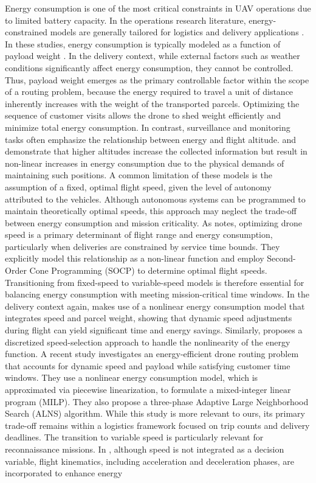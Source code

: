\documentclass[11pt]{article}
\begin{document}
Energy consumption is one of the most critical constraints in UAV operations due to limited battery capacity. In the operations research literature, energy-constrained models are generally tailored for logistics and delivery applications \citep{rojas2021unmanned}.  In these studies, energy consumption is typically modeled as a function of payload weight \citep{cheng2020drone, dorling2016vehicle, kyriakakis2023grasp, troudi2018sizing}. In the delivery context, while external factors such as weather conditions significantly affect energy consumption, they cannot be controlled. Thus, payload weight emerges as the primary controllable factor within the scope of a routing problem, because the energy required to travel a unit of distance inherently increases with the weight of the transported parcels. Optimizing the sequence of customer visits allows the drone to shed weight efficiently and minimize total energy consumption. In contrast, surveillance and monitoring tasks often emphasize the relationship between energy and flight altitude. \citep{di2016modelling} and \citep{zorbas2016optimal} demonstrate that higher altitudes increase the collected information but result in non-linear increases in energy consumption due to the physical demands of maintaining such positions. A common limitation of these models is the assumption of a fixed, optimal flight speed, given the level of autonomy attributed to the vehicles. Although autonomous systems can be programmed to maintain theoretically optimal speeds, this approach may neglect the trade-off between energy consumption and mission criticality. As \citep{dukkanci2021minimizing} notes, optimizing drone speed is a primary determinant of flight range and energy consumption, particularly when deliveries are constrained by service time bounds. They explicitly model this relationship as a non-linear function and employ Second-Order Cone Programming (SOCP) to determine optimal flight speeds. Transitioning from fixed-speed to variable-speed models is therefore essential for balancing energy consumption with meeting mission-critical time windows. In the delivery context again, \citep{raj2020multiple} makes use of a nonlinear energy consumption model that integrates speed and parcel weight, showing that dynamic speed adjustments during flight can yield significant time and energy savings. Similarly, \citep{tamke2023vehicle} proposes a discretized speed-selection approach to handle the nonlinearity of the energy function. A recent study \citep{wu2024energy} investigates an energy-efficient drone routing problem that accounts for dynamic speed and payload while satisfying customer time windows. They use a nonlinear energy consumption model, which is approximated via piecewise linearization, to formulate a mixed-integer linear program (MILP). They also propose a three-phase Adaptive Large Neighborhood Search (ALNS) algorithm. While this study is more relevant to ours, its primary trade-off remains within a logistics framework focused on trip counts and delivery deadlines. The transition to variable speed is particularly relevant for reconnaissance missions. In \citep{liu2022hybrid}, although speed is not integrated as a decision variable, flight kinematics, including acceleration and deceleration phases, are incorporated to enhance energy 
\end{document}
